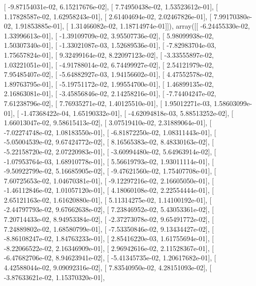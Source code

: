 \documentclass{article}
\begin{document}
       [ -9.87154031e-02,   6.15217676e-02],
       [  7.74950438e-02,   1.53523612e-01],
       [  1.17828587e-02,   1.62958243e-01],
       [  2.61404694e-02,   2.02467826e-01],
       [  7.99170380e-02,   1.91853885e-01],
       [  1.31466082e-02,   1.18714974e-01]]), array([[ -6.24455330e-02,   1.33996613e-01],
       [ -1.39109709e-02,   3.95507736e-02],
       [  5.98099938e-02,   1.50307340e-01],
       [ -1.33021087e-03,   1.52689536e-01],
       [ -7.82983704e-03,   1.75657824e-01],
       [  9.32499164e-02,   8.22097123e-02],
       [ -3.33555897e-02,   1.03221051e-01],
       [ -4.91788014e-02,   6.74499927e-02],
       [  2.54121979e-02,   7.95485407e-02],
       [ -5.64882927e-03,   1.94156602e-01],
       [  4.47552578e-02,   1.89763795e-01],
       [ -5.19751172e-02,   1.99554700e-01],
       [  1.46899135e-02,   2.16863081e-01],
       [ -3.45856846e-02,   2.14258216e-01],
       [ -7.74404247e-02,   7.61238796e-02],
       [  7.76935271e-02,   1.40125510e-01],
       [  1.95012271e-03,   1.58603099e-01],
       [ -1.47368422e-04,   1.65190332e-01],
       [ -4.62094818e-03,   5.88513252e-02],
       [  1.66013047e-02,   9.58615413e-02],
       [  3.07519410e-02,   2.31889064e-01],
       [ -7.02274748e-02,   1.08183550e-01],
       [ -6.81872250e-02,   1.08311443e-01],
       [ -5.05004539e-02,   9.67424772e-02],
       [  8.16565383e-02,   8.48330163e-02],
       [ -5.22158720e-02,   2.07220983e-01],
       [ -3.60994480e-02,   5.64963914e-02],
       [ -1.07953764e-03,   1.68910778e-01],
       [  5.56619793e-02,   1.93011114e-01],
       [ -9.50922799e-02,   5.16685905e-02],
       [ -9.47621560e-02,   1.75407708e-01],
       [  7.60725653e-02,   1.04670381e-01],
       [ -9.12297216e-02,   2.16605050e-01],
       [ -1.46112846e-02,   1.01057120e-01],
       [  4.18060108e-02,   2.22554444e-01],
       [  2.65121163e-02,   1.61620880e-01],
       [  5.11314275e-02,   1.14100192e-01],
       [ -2.44797793e-02,   9.67662638e-02],
       [  7.23846952e-02,   5.43053361e-02],
       [  7.20714433e-02,   8.94953384e-02],
       [ -2.37273078e-02,   9.65491772e-02],
       [  7.24889802e-02,   1.68580799e-01],
       [ -7.53350846e-02,   9.13434427e-02],
       [ -8.86108247e-02,   1.84763233e-01],
       [  2.85416220e-03,   1.61755694e-01],
       [ -8.22066522e-02,   2.16346909e-01],
       [  2.96942616e-02,   2.11528367e-01],
       [ -6.47682706e-02,   8.94623941e-02],
       [ -5.41345735e-02,   1.20617682e-01],
       [  4.42588044e-02,   9.09092316e-02],
       [  7.83540950e-02,   4.28151093e-02],
       [ -3.87633621e-02,   1.15370320e-01],
\end{document}
